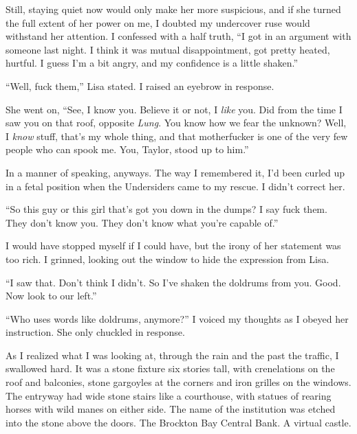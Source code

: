 Still, staying quiet now would only make her more suspicious, and if she turned the full extent of her power on me, I doubted my undercover ruse would withstand her attention.  I confessed with a half truth, ``I got in an argument with someone last night.  I think it was mutual disappointment, got pretty heated, hurtful.  I guess I'm a bit angry, and my confidence is a little shaken.''



``Well, fuck them,'' Lisa stated.  I raised an eyebrow in response.



She went on, ``See, I know you.  Believe it or not, I \emph{like} you.  Did from the time I saw you on that roof, opposite \emph{Lung}.  You know how we fear the unknown?  Well, I \emph{know} stuff, that's my whole thing, and that motherfucker is one of the very few people who can spook me.  You, Taylor, stood up to him.''



In a manner of speaking, anyways.  The way I remembered it, I'd been curled up in a fetal position when the Undersiders came to my rescue.  I didn't correct her.



``So this guy or this girl that's got you down in the dumps?  I say fuck them.  They don't know you.  They don't know what you're capable of.''



I would have stopped myself if I could have, but the irony of her statement was too rich.  I grinned, looking out the window to hide the expression from Lisa.



``I saw that.  Don't think I didn't.  So I've shaken the doldrums from you.  Good.  Now look to our left.''



``Who uses words like doldrums, anymore?'' I voiced my thoughts as I obeyed her instruction.  She only chuckled in response.



As I realized what I was looking at, through the rain and the past the traffic, I swallowed hard.  It was a stone fixture six stories tall, with crenelations on the roof and balconies, stone gargoyles at the corners and iron grilles on the windows. The entryway had wide stone stairs like a courthouse, with statues of rearing horses with wild manes on either side.  The name of the institution was etched into the stone above the doors.  The Brockton Bay Central Bank.  A virtual castle.



